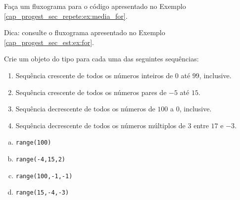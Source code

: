 \begin{exer}
  Faça um fluxograma para o código apresentado no Exemplo \ref{cap_progest_sec_repete:ex:media_for}.
\end{exer}
\begin{resp}
  Dica: consulte o fluxograma apresentado no Exemplo \ref{cap_progest_sec_est:ex:for}.
\end{resp}

\begin{exer}
  Crie um objeto do tipo {\PYTHONrange} para cada uma das seguintes sequências:
  \begin{enumerate}
  \item Sequência crescente de todos os números inteiros de $0$ até $99$, inclusive.
  \item Sequência crescente de todos os números pares de $-5$ até $15$.
  \item Sequência decrescente de todos os números de $100$ a $0$, inclusive.
  \item Sequência decrescente de todos os números múltiplos de $3$ entre $17$ e $-3$.
  \end{enumerate}
\end{exer}
\begin{resp}
  \begin{enumerate}[a)]
  \item \lstinline+range(100)+
  \item \lstinline+range(-4,15,2)+
  \item \lstinline+range(100,-1,-1)+
  \item \lstinline+range(15,-4,-3)+
  \end{enumerate}
\end{resp}

